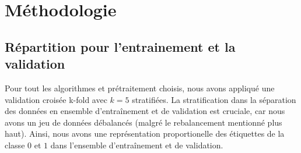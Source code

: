 \documentclass{article}
\begin{document}
\section{Méthodologie}
\subsection{Répartition pour l'entrainement et la validation}
Pour tout les algorithmes et prétraitement choisis, nous avons appliqué une validation croisée k-fold avec $k = 5$ stratifiées. La stratification dans la séparation des données en ensemble d'entraînement et de validation est cruciale, car nous avons un jeu de données débalancés (malgré le rebalancement mentionné plus haut). Ainsi, nous avons une représentation proportionelle des étiquettes de la classe $0$ et $1$ dans l'ensemble d'entraînement et de validation.
\end{document}
